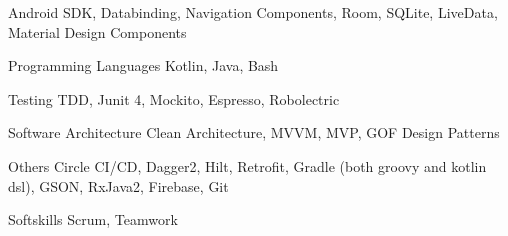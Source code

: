 
\begin{cvskills}

  \cvskill
    {Android} %
    {SDK, Databinding, Navigation Components, Room, SQLite, LiveData, Material Design Components} %

  \cvskill
    {Programming Languages} %
    {Kotlin, Java, Bash} %

  \cvskill
    {Testing} %
    {TDD, Junit 4, Mockito, Espresso, Robolectric} %

  \cvskill
    {Software Architecture} %
    {Clean Architecture, MVVM, MVP, GOF Design Patterns} %

  \cvskill
    {Others} %
    {Circle CI/CD, Dagger2, Hilt, Retrofit, Gradle (both groovy and kotlin dsl), GSON, RxJava2, Firebase, Git} %

  \cvskill
    {Softskills} %
    {Scrum, Teamwork} %

\end{cvskills}